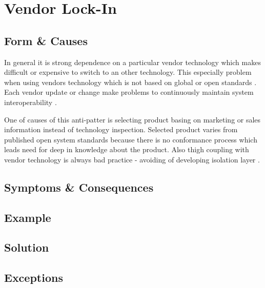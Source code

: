 \section{Vendor Lock-In}

\subsection{Form \& Causes}
In general it is strong dependence on a particular vendor technology which makes difficult or expensive to switch to an other technology. This especially problem when using vendors technology which is not based on global or open standards \cite{c2comVendor}. Each vendor update or change make problems to continuously maintain system interoperability \cite{SurvivalGuide}.

One of causes of this anti-patter is selecting product basing on marketing or sales information instead of technology inspection. Selected product varies from published open system standards because there is no conformance process which leads need for deep in knowledge about the product. Also thigh coupling with vendor technology is always bad practice - avoiding of developing isolation layer \cite{SurvivalGuide}.

\subsection{Symptoms \& Consequences}

\subsection{Example}

\subsection{Solution}

\subsection{Exceptions}